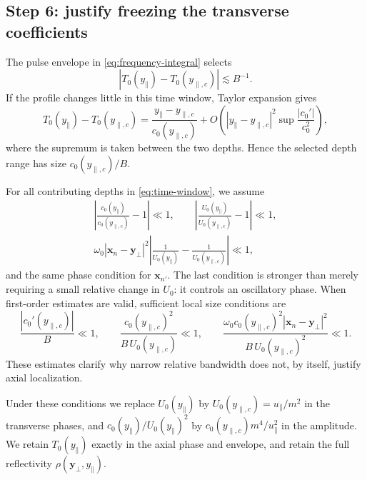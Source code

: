 \documentclass[11pt]{article}
\newcommand{\bx}{\bm{x}}
\newcommand{\by}{\bm{y}}
\begin{document}
\subsection{Step 6: justify freezing the transverse coefficients}

The pulse envelope in \eqref{eq:frequency-integral} selects
\begin{equation}
|T_0(y_\parallel)-T_0(y_{\parallel,c})|\lesssim B^{-1}.
\label{eq:time-window}
\end{equation}
If the profile changes little in this time window, Taylor expansion gives
\begin{equation}
T_0(y_\parallel)-T_0(y_{\parallel,c})
=\frac{y_\parallel-y_{\parallel,c}}{c_0(y_{\parallel,c})}
+O\!\left(
|y_\parallel-y_{\parallel,c}|^2
\sup\frac{|c_0'|}{c_0^2}\right),
\end{equation}
where the supremum is taken between the two depths. Hence the selected
depth range has size $c_0(y_{\parallel,c})/B$.

For all contributing depths in \eqref{eq:time-window}, we assume
\begin{gather}
\left|\frac{c_0(y_\parallel)}{c_0(y_{\parallel,c})}-1\right|\ll1,
\qquad
\left|\frac{U_0(y_\parallel)}{U_0(y_{\parallel,c})}-1\right|\ll1,
\label{eq:freeze-amplitude}\\
\omega_0|\bx_n-\by_\perp|^2
\left|\frac{1}{U_0(y_\parallel)}
-\frac{1}{U_0(y_{\parallel,c})}\right|\ll1,
\label{eq:freeze-phase}
\end{gather}
and the same phase condition for $\bx_{n'}$.
The last condition is stronger than merely requiring a small relative
change in $U_0$: it controls an oscillatory phase.
When first-order estimates are valid, sufficient local size conditions
are
\begin{equation}
\frac{|c_0'(y_{\parallel,c})|}{B}\ll1,\qquad
\frac{c_0(y_{\parallel,c})^2}{B\,U_0(y_{\parallel,c})}\ll1,\qquad
\frac{\omega_0 c_0(y_{\parallel,c})^2|\bx_n-\by_\perp|^2}
{B\,U_0(y_{\parallel,c})^2}\ll1.
\label{eq:freeze-scales}
\end{equation}
These estimates clarify why narrow relative bandwidth does not, by
itself, justify axial localization.

Under these conditions we replace $U_0(y_\parallel)$ by
$U_0(y_{\parallel,c})=u_\parallel/m^2$ in the transverse phases, and
$c_0(y_\parallel)/U_0(y_\parallel)^2$ by
$c_0(y_{\parallel,c})m^4/u_\parallel^2$ in the amplitude.
We retain $T_0(y_\parallel)$ exactly in the axial phase and envelope,
and retain the full reflectivity $\rho(\by_\perp,y_\parallel)$.
\end{document}
